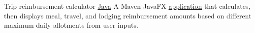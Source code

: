 {Trip reimbursement calculator}
{\href{https://github.com/JacobArchambault?tab=repositories\&q=\&type=\&language=java}{Java}}
{A Maven JavaFX \href{https://github.com/jacobarchambault/travelexpenses}{application} that calculates, then displays meal, travel, and lodging reimbursement amounts based on different maximum daily allotments from user inputs.}
